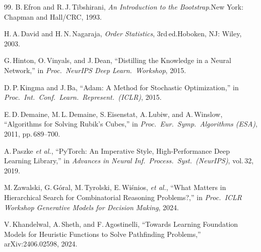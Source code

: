 \documentclass[graybox]{svmult}
\begin{document}
\begin{thebibliography}{99.}
B.\,Efron and R.\,J.\,Tibshirani, \textit{An Introduction to the
Bootstrap}.\quad New York: Chapman and Hall/CRC, 1993.

H.\,A.\,David and H.\,N.\,Nagaraja, \textit{Order Statistics},
3rd\,ed.\quad Hoboken, NJ: Wiley, 2003.

G.\,Hinton, O.\,Vinyals, and J.\,Dean, ``Distilling the Knowledge
in a Neural Network,'' in \textit{Proc.\ NeurIPS Deep Learn.\
Workshop}, 2015.

D.\,P.\,Kingma and J.\,Ba, ``{A}dam: A Method for Stochastic
Optimization,'' in \textit{Proc.\ Int.\ Conf.\ Learn.\ Represent.\
(ICLR)}, 2015.

E.\,D.\,Demaine, M.\,L.\,Demaine, S.\,Eisenstat, A.\,Lubiw, and
A.\,Winslow, ``Algorithms for Solving {R}ubik's {C}ubes,'' in
\textit{Proc.\ Eur.\ Symp.\ Algorithms (ESA)}, 2011,
pp.\,689--700.

A.\,Paszke \textit{et al.}, ``{P}y{T}orch: An Imperative Style,
High-Performance Deep Learning Library,'' in \textit{Advances in
Neural Inf.\ Process.\ Syst.\ (NeurIPS)}, vol.\,32, 2019.

M.\,Zawalski, G.\,G\'oral, M.\,Tyrolski, E.\,Wi\'snios,
\textit{et al.}, ``What Matters in Hierarchical Search for
Combinatorial Reasoning Problems?,'' in \textit{Proc.\ ICLR Workshop
Generative Models for Decision Making}, 2024.

V.\,Khandelwal, A.\,Sheth, and F.\,Agostinelli, ``Towards Learning
Foundation Models for Heuristic Functions to Solve Pathfinding
Problems,'' arXiv:2406.02598, 2024.

\end{thebibliography}
\end{document}
